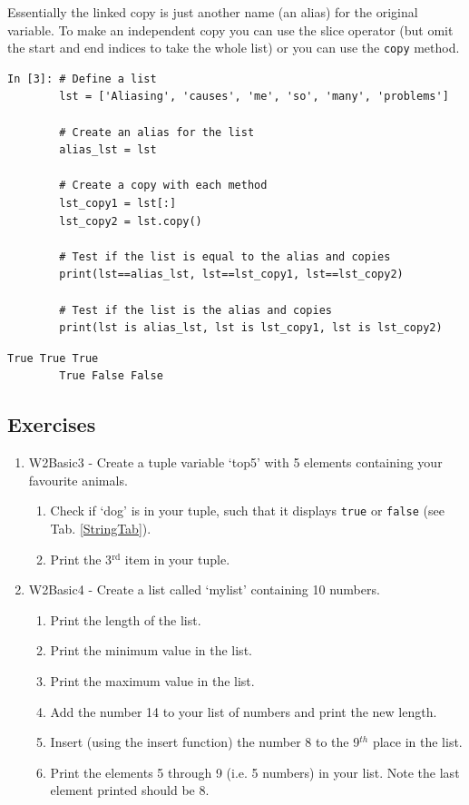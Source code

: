 \begin{tcolorbox}[colback=red!5!white,colframe=red!75!black]
 Essentially the linked copy is just another name (an alias) for the original variable. To make an independent copy you can use the slice operator (but omit the start and end indices to take the whole list) or you can use the \texttt{copy} method.
\begin{lstlisting}[style=PY]
In [3]: # Define a list
        lst = ['Aliasing', 'causes', 'me', 'so', 'many', 'problems']
        
        # Create an alias for the list
        alias_lst = lst
        
        # Create a copy with each method
        lst_copy1 = lst[:]
        lst_copy2 = lst.copy()
        
        # Test if the list is equal to the alias and copies
        print(lst==alias_lst, lst==lst_copy1, lst==lst_copy2)
        
        # Test if the list is the alias and copies
        print(lst is alias_lst, lst is lst_copy1, lst is lst_copy2)
\end{lstlisting}
\begin{lstlisting}[style=PY_out]
        True True True
        True False False
\end{lstlisting}
\end{tcolorbox}

\subsection{Exercises}

\begin{enumerate}
\item W2Basic3 - Create a tuple variable `top5' with 5 elements containing your favourite animals.
\begin{enumerate}
      \item Check if `dog' is in your tuple, such that it displays {\tt true} or {\tt false} (see Tab. \ref{StringTab}).
      \item Print the 3$^{\text{rd}}$ item in your tuple.\\
\end{enumerate}

\item W2Basic4 - Create a list called `mylist' containing 10 numbers.
\begin{enumerate}
      \item Print the length of the list.
      \item Print the minimum value in the list.
      \item Print the maximum value in the list.
      \item Add the number 14 to your list of numbers and print the new length.
      \item Insert (using the insert function) the number 8 to the 9$^{th}$ place in the list.
      \item Print the elements 5 through 9 (i.e. 5 numbers) in your list. Note the last element printed should be 8.
\end{enumerate}
\end{enumerate}


